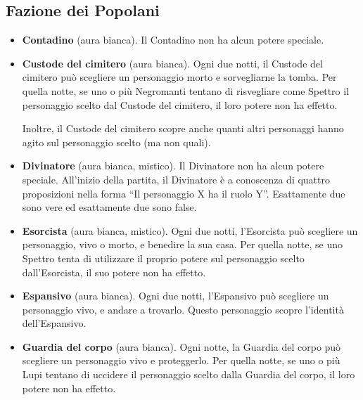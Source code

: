 \documentclass[a4paper,10pt]{article}
\begin{document}
\subsection*{Fazione dei Popolani}

\begin{itemize}
 \item {\bf Contadino} (aura bianca). Il Contadino non ha alcun potere speciale.

 
  \item {\bf Custode del cimitero} (aura bianca). Ogni due notti, il Custode del cimitero può scegliere un personaggio morto e sorvegliarne la tomba. Per quella notte, se uno o più Negromanti tentano di risvegliare come Spettro il personaggio scelto dal Custode del cimitero, il loro potere non ha effetto.
  
  Inoltre, il Custode del cimitero scopre anche quanti altri personaggi hanno agito sul personaggio scelto (ma non quali).
%  

 \item {\bf Divinatore} (aura bianca, mistico). Il Divinatore non ha alcun potere speciale. All'inizio della partita, il Divinatore è a conoscenza di quattro proposizioni nella forma ``Il personaggio X ha il ruolo Y''. Esattamente due sono vere ed esattamente due sono false.

 \item {\bf Esorcista} (aura bianca, mistico). Ogni due notti, l'Esorcista può scegliere un personaggio, vivo o morto, e benedire la sua casa. Per quella notte, se uno Spettro tenta di utilizzare il proprio potere sul personaggio scelto dall'Esorcista, il suo potere non ha effetto.
 
 
 \item {\bf Espansivo} (aura bianca). Ogni due notti, l'Espansivo può scegliere un personaggio vivo, e andare a trovarlo. Questo personaggio scopre l'identità dell'Espansivo.

 \item {\bf Guardia del corpo} (aura bianca). Ogni notte, la Guardia del corpo può scegliere un personaggio vivo e proteggerlo. Per quella notte, se uno o più Lupi tentano di uccidere il personaggio scelto dalla Guardia del corpo, il loro potere non ha effetto.
 

\end{itemize}
\end{document}
